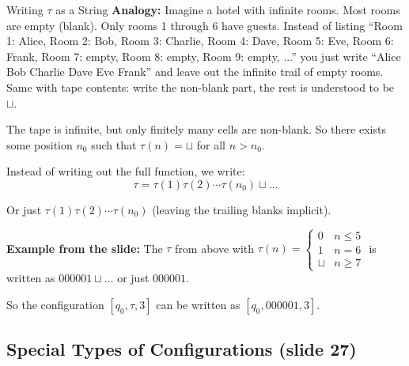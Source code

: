 \documentclass[11pt,a4paper]{article}
\begin{document}
\begin{notebox}{Writing $\tau$ as a String}
\textbf{Analogy:} Imagine a hotel with infinite rooms. Most rooms are empty (blank). Only rooms 1 through 6 have guests. Instead of listing ``Room 1: Alice, Room 2: Bob, Room 3: Charlie, Room 4: Dave, Room 5: Eve, Room 6: Frank, Room 7: empty, Room 8: empty, Room 9: empty, ...'' you just write ``Alice Bob Charlie Dave Eve Frank'' and leave out the infinite trail of empty rooms. Same with tape contents: write the non-blank part, the rest is understood to be $\sqcup$.

The tape is infinite, but only finitely many cells are non-blank. So there exists some position $n_0$ such that $\tau(n) = \sqcup$ for all $n > n_0$.

Instead of writing out the full function, we write:
$$\tau = \tau(1)\tau(2)\cdots\tau(n_0)\sqcup\ldots$$

Or just $\tau(1)\tau(2)\cdots\tau(n_0)$ (leaving the trailing blanks implicit).

\textbf{Example from the slide:} The $\tau$ from above with $\tau(n) = \begin{cases} 0 & n \leq 5 \\ 1 & n = 6 \\ \sqcup & n \geq 7 \end{cases}$ is written as $000001\sqcup\ldots$ or just $000001$.

So the configuration $[q_0, \tau, 3]$ can be written as $[q_0, 000001, 3]$.
\end{notebox}

\subsection{Special Types of Configurations (slide 27)}
\end{document}
